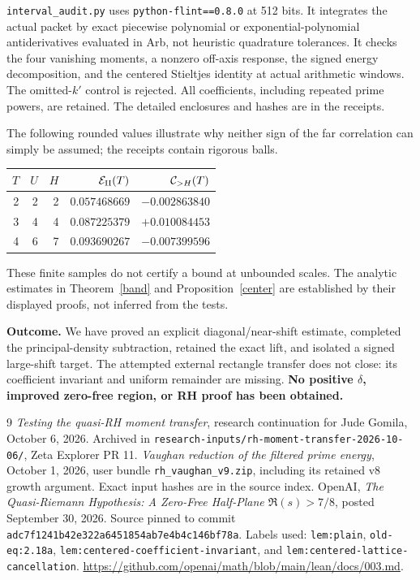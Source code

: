 \documentclass[11pt]{article}
\begin{document}
\texttt{interval\_audit.py} uses \texttt{python-flint==0.8.0} at 512 bits.
It integrates the actual packet by exact piecewise polynomial or
exponential-polynomial antiderivatives evaluated in Arb, not heuristic
quadrature tolerances. It checks the four vanishing moments, a nonzero
off-axis response, the signed energy decomposition, and the centered
Stieltjes identity at actual arithmetic windows. The omitted-$k'$
control is rejected. All coefficients, including repeated prime powers,
are retained. The detailed enclosures and hashes are in the receipts.

The following rounded values illustrate why neither sign of the far
correlation can simply be assumed; the receipts contain rigorous balls.
\begin{center}\small
\begin{tabular}{rrrrr}
\toprule
$T$ & $U$ & $H$ & $\mathcal E_{\rm II}(T)$ & $\mathcal C_{>H}(T)$\\
\midrule
2 & 2 & 2 & $0.057468669$ & $-0.002863840$\\
3 & 4 & 4 & $0.087225379$ & $+0.010084453$\\
4 & 6 & 7 & $0.093690267$ & $-0.007399596$\\
\bottomrule
\end{tabular}
\end{center}
These finite samples do not certify a bound at unbounded scales.
The analytic estimates in Theorem~\ref{band} and Proposition~\ref{center}
are established by their displayed proofs, not inferred from the tests.

\textbf{Outcome.} We have proved an explicit diagonal/near-shift estimate,
completed the principal-density subtraction, retained the exact lift,
and isolated a signed large-shift target. The attempted external
rectangle transfer does not close: its coefficient invariant and
uniform remainder are missing. \textbf{No positive $\delta$, improved
zero-free region, or RH proof has been obtained.}

\begin{thebibliography}{9}\small
{} \emph{Testing the quasi-RH moment transfer}, research
continuation for Jude Gomila, October 6, 2026. Archived in
\texttt{research-inputs/rh-moment-transfer-2026-10-06/}, Zeta Explorer PR 11.
 \emph{Vaughan reduction of the filtered prime energy},
October 1, 2026, user bundle \texttt{rh\_vaughan\_v9.zip}, including its
retained v8 growth argument. Exact input hashes are in the source index.
 OpenAI, \emph{The Quasi-Riemann Hypothesis: A Zero-Free
Half-Plane $\Re(s)>7/8$}, posted September 30, 2026. Source pinned to
commit \texttt{adc7f1241b42e322a6451854ab7e4b4c146bf78a}.
Labels used: \texttt{lem:plain}, \texttt{old-eq:2.18a},
\texttt{lem:centered-coefficient-invariant}, and
\texttt{lem:centered-lattice-cancellation}.
\url{https://github.com/openai/math/blob/main/lean/docs/003.md}.
\end{thebibliography}
\end{document}
